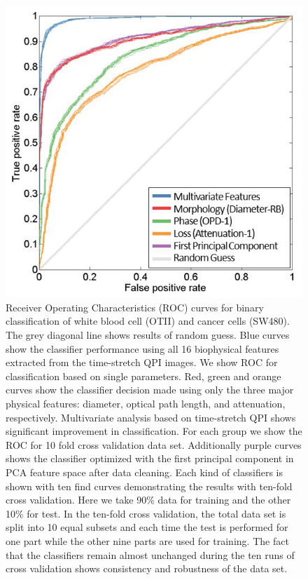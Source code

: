 \documentclass[aps,pra,reprint,superscriptaddress]{revtex4-1}
\begin{document}
\begin{figure}
\includegraphics[scale=0.6]{FigureOTSWROC.jpg}
\caption{\label{fig:OTSWROC} Receiver Operating Characteristics (ROC) curves for binary classification of white blood cell (OTII) and cancer cells (SW480). The grey diagonal line shows results of random guess. Blue curves show the classifier performance using all 16 biophysical features extracted from the time-stretch QPI images. 
We show ROC for classification based on single parameters. Red, green and orange curves show the classifier decision made using only the three major physical features: diameter, optical path length, and attenuation, respectively. Multivariate analysis based on time-stretch QPI shows significant improvement in classification. For each group we show the ROC for 10 fold cross validation data set. Additionally purple curves shows the classifier optimized with the first principal component in PCA feature space after data cleaning. Each kind of classifiers is shown with ten find curves demonstrating the results with ten-fold cross validation. Here we take 90\% data for training and the other 10\% for test. In the ten-fold cross validation, the total data set is split into 10 equal subsets and each time the test is performed for one part while the other nine parts are used for training. The fact that the classifiers remain almost unchanged during the ten runs of cross validation shows consistency and robustness of the data set.}
\end{figure}
\end{document}
